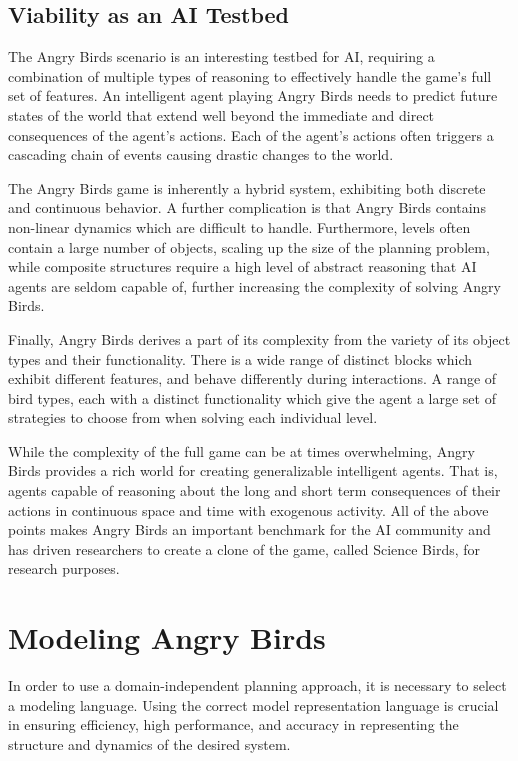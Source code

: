\subsection{Viability as an AI Testbed}

The Angry Birds scenario is an interesting testbed for AI, requiring a combination of multiple types of reasoning to effectively handle the game's full set of features. An intelligent agent playing Angry Birds needs to predict future states of the world that extend well beyond the immediate and direct consequences of the agent's actions. Each of the agent's actions often triggers a cascading chain of events causing drastic changes to the world. 

The Angry Birds game is inherently a hybrid system, exhibiting both discrete and continuous behavior. A further complication is that Angry Birds contains non-linear dynamics which are difficult to handle. Furthermore, levels often contain a large number of objects, scaling up the size of the planning problem, while composite structures require a high level of abstract reasoning that AI agents are seldom capable of, further increasing the complexity of solving Angry Birds.

Finally, Angry Birds derives a part of its complexity from the variety of its object types and their functionality. There is a wide range of distinct blocks which exhibit different features, and behave differently during interactions. A range of bird types, each with a distinct functionality which give the agent a large set of strategies to choose from when solving each individual level. 

While the complexity of the full game can be at times overwhelming, Angry Birds provides a rich world for creating generalizable intelligent agents. That is, agents capable of reasoning about the long and short term consequences of their actions in continuous space and time with exogenous activity. All of the above points makes Angry Birds an important benchmark for the AI community and has driven researchers to create a clone of the game, called Science Birds\cite{renz2019ai}, for research purposes.




\section{Modeling Angry Birds}

In order to use a domain-independent planning approach, it is necessary to select a modeling language. Using the correct model representation language is crucial in ensuring efficiency, high performance, and accuracy in representing the structure and dynamics of the desired system. 

